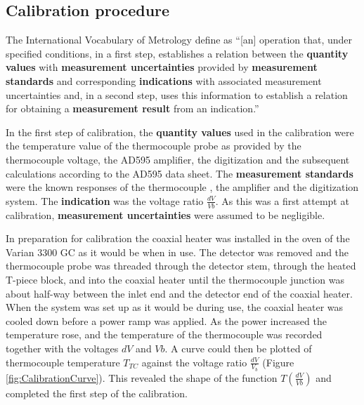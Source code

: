 \subsection{Calibration procedure}

The International Vocabulary of Metrology \autocite{JCGM200:2012} define
 as ``[an] operation that, under specified conditions, in a
first step, establishes a relation between the \textbf{quantity values} with
\textbf{measurement uncertainties} provided by \textbf{measurement standards}
and corresponding \textbf{indications} with associated measurement uncertainties
and, in a second step, uses this information to establish a relation for
obtaining a \textbf{measurement result} from an indication.''

In the first step of calibration, the \textbf{quantity values} used in the
calibration were the temperature value of the thermocouple probe as provided by
the thermocouple voltage, the AD595 amplifier, the digitization and the
subsequent calculations according to the AD595 data sheet. The
\textbf{measurement standards} were the known responses of the thermocouple
\autocite{Ripple1995}, the amplifier and the digitization system. The
\textbf{indication} was the voltage ratio \(\frac{dV}{Vb}\). As this was a first
attempt at calibration, \textbf{measurement uncertainties} were assumed to be
negligible.

In preparation for calibration the coaxial heater was installed in the oven of
the Varian 3300 GC as it would be when in use. The detector was removed and the
thermocouple probe was threaded through the detector stem, through the heated
T-piece block, and into the coaxial heater until the thermocouple junction was
about half-way between the inlet end and the detector end of the coaxial heater.
When the system was set up as it would be during use, the coaxial heater was
cooled down before a power ramp was applied. As the power increased the
temperature rose, and the temperature of the thermocouple was recorded together
with the voltages \(dV\) and \(Vb\). A curve could then be plotted of
thermocouple temperature \(T_{TC}\) against the voltage ratio \( \frac{dV}{V_b}
\) (Figure \ref{fig:CalibrationCurve}). This revealed the shape of the function
\(T(\frac{dV}{Vb})\) and completed the first step of the calibration.

